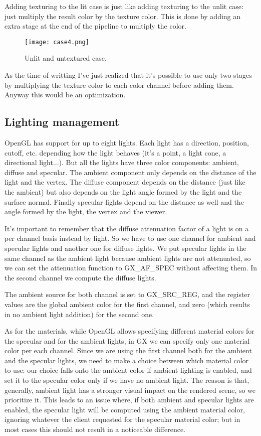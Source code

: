 \documentclass[12pt]{article}
\begin{document}
Adding texturing to the lit case is just like adding texturing to the unlit case: just multiply the result color by the texture color. This is done by adding an extra stage at the end of the pipeline to multiply the color.

\begin{figure}[ht]
\centering
\texttt{[image: case4.png]}
\caption{Unlit and untextured case. }
\label{fig:case4}
\end {figure}

As the time of writting I've just realized that it's possible to use only two stages by multiplying the texture color to each color channel before adding them. Anyway this would be an optimization.

\subsection {Lighting management}

OpenGL has support for up to eight lights. Each light has a direction, position, cutoff, etc. depending how the light behaves (it's a point, a light cone, a directional light...). But all the lights have three color components: ambient, diffuse and specular. The ambient component only depends on the distance of the light and the vertex. The diffuse component depends on the distance (just like the ambient) but also depends on the light angle formed by the light and the surface normal. Finally specular lights depend on the distance as well and the angle formed by the light, the vertex and the viewer.

It's important to remember that the diffuse attenuation factor of a light is on a per channel basis instead by light. So we have to use one channel for ambient and specular lights and another one for diffuse lights. We put specular lights in the same channel as the ambient light because ambient lights are not attenuated, so we can set the attenuation function to GX\_AF\_SPEC without affecting them. In the second channel we compute the diffuse lights.

The ambient source for both channel is set to GX\_SRC\_REG, and the register values are the global ambient color for the first channel, and zero (which results in no ambient light addition) for the second one.

As for the materials, while OpenGL allows specifying different material colors for the specular and for the ambient lights, in GX we can specify only one material color per each channel. Since we are using the first channel both for the ambient and the specular lights, we need to make a choice between which material color to use: our choice falls onto the ambient color if ambient lighting is enabled, and set it to the specular color only if we have no ambient light. The reason is that, generally, ambient light has a stronger visual impact on the rendered scene, so we prioritize it. This leads to an issue where, if both ambient and specular lights are enabled, the specular light will be computed using the ambient material color, ignoring whatever the client requested for the specular material color; but in most cases this should not result in a noticeable difference.
\end{document}
